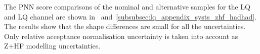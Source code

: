 
The PNN score comparisons of the nominal and alternative samples for the LQ \lephad and LQ \hadhad channel are shown in~ and~\ref{subsubsec:lq_appendix_systs_zhf_hadhad}.
The results show that the shape differences are small for all the uncertainties.
Only relative acceptance normalisation uncertainty is taken into account as Z+HF modelling uncertainties.




